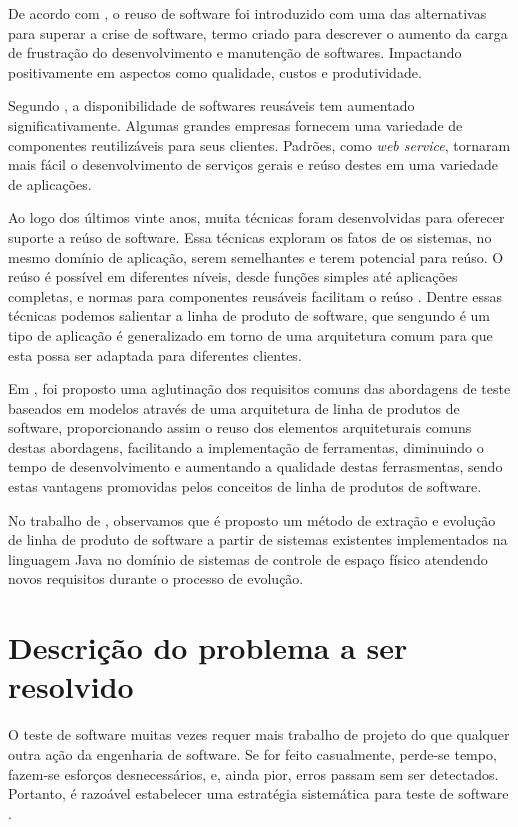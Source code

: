 \documentclass[12pt,a4paper]{article}
\begin{document}
De acordo com \cite{sametinger1997}, o reuso de software foi introduzido com uma das alternativas para superar a crise de software, termo criado para descrever o aumento da carga de frustração do desenvolvimento e manutenção de softwares. Impactando positivamente em aspectos como qualidade, custos e produtividade.

Segundo \cite{Sommerville2011}, a disponibilidade de softwares reusáveis tem aumentado significativamente. Algumas grandes empresas fornecem uma variedade de componentes reutilizáveis para seus clientes. Padrões, como \textit{web service}, tornaram mais fácil o desenvolvimento de serviços gerais e reúso destes em uma variedade de aplicações.

Ao logo dos últimos vinte anos, muita técnicas foram desenvolvidas para oferecer suporte a reúso de software. Essa técnicas exploram os fatos de os sistemas, no mesmo domínio de aplicação, serem semelhantes e terem potencial para reúso. O reúso é possível em diferentes níveis, desde funções simples até aplicações completas, e normas para componentes reusáveis facilitam o reúso \cite{Sommerville2011}. Dentre essas técnicas podemos salientar a linha de produto de software, que sengundo \cite{Sommerville2011} é um tipo de aplicação é generalizado em torno de uma arquitetura comum para que esta possa ser adaptada para diferentes clientes.

Em \cite{orozco2008}, foi proposto uma aglutinação dos requisitos comuns das abordagens de teste baseados em modelos através de uma arquitetura de linha de produtos de software, proporcionando assim o reuso dos elementos arquiteturais comuns destas abordagens, facilitando a implementação de ferramentas, diminuindo o tempo de desenvolvimento e aumentando a qualidade destas ferrasmentas, sendo estas vantagens promovidas pelos conceitos de linha de produtos de software.

No trabalho de \cite{pontes2017}, observamos que é proposto um método de extração e evolução de linha de produto de software a partir de sistemas existentes implementados na linguagem Java no domínio de sistemas de controle de espaço físico atendendo novos requisitos durante o processo de evolução.

\section{Descrição do problema a ser resolvido}
O teste de software muitas vezes requer mais trabalho de projeto do que qualquer outra ação da engenharia de software. Se for feito casualmente, perde-se tempo, fazem-se esforços desnecessários, e, ainda pior, erros passam sem ser detectados. Portanto, é razoável estabelecer uma estratégia sistemática para teste de software \cite{pressman2011}.
\end{document}
